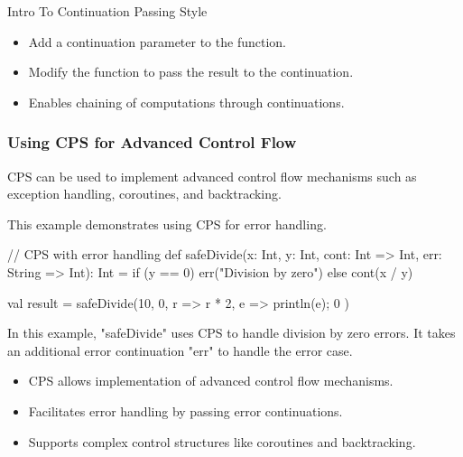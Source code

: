 \begin{notes}{Intro To Continuation Passing Style}
\begin{highlight}
        \begin{itemize}
            \item Add a continuation parameter to the function.
            \item Modify the function to pass the result to the continuation.
            \item Enables chaining of computations through continuations.
        \end{itemize}
    
    \end{highlight}
    
    \subsubsection*{Using CPS for Advanced Control Flow}
    
    CPS can be used to implement advanced control flow mechanisms such as exception handling, coroutines, and backtracking.
    
    \begin{highlight}
    
        This example demonstrates using CPS for error handling.
    
    \begin{code}[Scala]
    // CPS with error handling
    def safeDivide(x: Int, y: Int, cont: Int => Int, err: String => Int): Int =
        if (y == 0) err("Division by zero") else cont(x / y)
    
    val result = safeDivide(10, 0, r => r * 2, e => { println(e); 0 })
    \end{code}
    
        In this example, "safeDivide" uses CPS to handle division by zero errors. It takes an additional error continuation "err" to handle the error case.
    
        \begin{itemize}
            \item CPS allows implementation of advanced control flow mechanisms.
            \item Facilitates error handling by passing error continuations.
            \item Supports complex control structures like coroutines and backtracking.
        \end{itemize}
    
    \end{highlight}
    
    \begin{highlight}
    

\end{highlight}
\end{notes}
